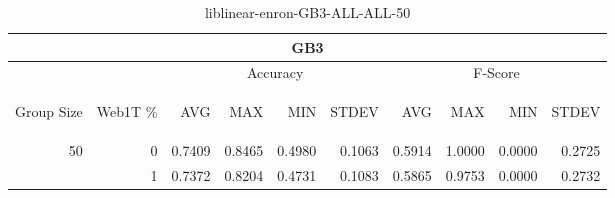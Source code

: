 \begin{center}
\begin{table}[htbp]
\begin{tabular}{ | r | r | r | r | r | r | r | r | r | r |}
\hline
\multicolumn{10}{|c|}{GB3}\\
\hline
 & & \multicolumn{4}{|c|}{Accuracy} & \multicolumn{4}{|c|}{F-Score}\\ \cline{3-10}
\begin{sideways}Group Size\end{sideways} & \begin{sideways}Web1T \%\end{sideways} & \begin{sideways}AVG\end{sideways} & \begin{sideways}MAX\end{sideways} & \begin{sideways}MIN\end{sideways} & \begin{sideways}STDEV\end{sideways} & \begin{sideways}AVG\end{sideways} & \begin{sideways}MAX\end{sideways} & \begin{sideways}MIN\end{sideways} & \begin{sideways}STDEV\end{sideways}\\
\hline
\multirow{1}{*}{50}
 & 0 & 0.7409 & 0.8465 & 0.4980 & 0.1063 & 0.5914 & 1.0000 & 0.0000 & 0.2725\\ \cline{2-10}
 & 1 & 0.7372 & 0.8204 & 0.4731 & 0.1083 & 0.5865 & 0.9753 & 0.0000 & 0.2732\\ \cline{2-10}
\hline
\end{tabular}
\caption{liblinear-enron-GB3-ALL-ALL-50}
\label{table:liblinear-enron-GB3-ALL-ALL-50}
\end{table}
\end{center}

